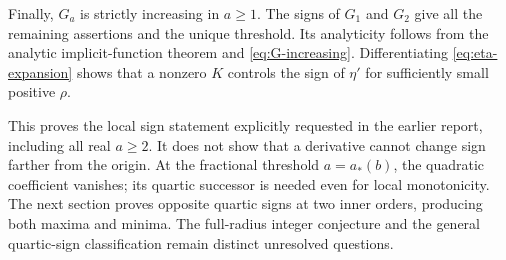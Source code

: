 Finally, $G_a$ is strictly increasing in $a\ge1$. The signs of
$G_1$ and $G_2$ give all the remaining assertions and the unique
threshold. Its analyticity follows from the analytic implicit-function
theorem and \eqref{eq:G-increasing}. Differentiating
\eqref{eq:eta-expansion} shows that a nonzero $K$ controls the sign
of $\eta'$ for sufficiently small positive $\rho$.

\begin{remark}
This proves the local sign statement explicitly requested in the earlier
report, including all real $a\ge2$. It does not show that a derivative
cannot change sign farther from the origin. At the fractional threshold
$a=a_*(b)$, the quadratic coefficient vanishes; its quartic successor is
needed even for local monotonicity. The next section proves opposite
quartic signs at two inner orders, producing both maxima and minima.
The full-radius integer conjecture and the general quartic-sign
classification remain distinct unresolved questions.
\end{remark}
